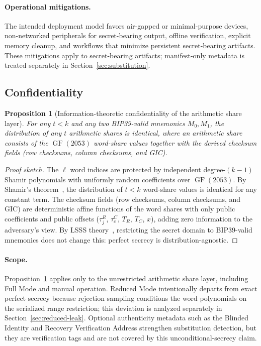 \documentclass[11pt]{article}
\newcommand{\GF}{\operatorname{GF}}
\newtheorem{proposition}[theorem]{Proposition}
\begin{document}
\paragraph{Operational mitigations.} The intended deployment model favors air-gapped or minimal-purpose devices, non-networked peripherals for secret-bearing output, offline verification, explicit memory cleanup, and workflows that minimize persistent secret-bearing artifacts. These mitigations apply to secret-bearing artifacts; manifest-only metadata is treated separately in Section~\ref{sec:substitution}.

\subsection{Confidentiality}

\begin{proposition}[Information-theoretic confidentiality of the arithmetic share layer]
\label{prop:conf}
For any $t < k$ and any two BIP39-valid mnemonics $M_0, M_1$, the distribution of any $t$ arithmetic shares is identical, where an arithmetic share consists of the $\GF(2053)$ word-share values together with the derived checksum fields (row checksums, column checksums, and GIC).
\end{proposition}

\begin{proof}[Proof sketch]
The $\ell$ word indices are protected by independent degree-$(k{-}1)$ Shamir polynomials with uniformly random coefficients over $\GF(2053)$. By Shamir's theorem~\cite{shamir1979}, the distribution of $t < k$ word-share values is identical for any constant term. The checksum fields (row checksums, column checksums, and GIC) are deterministic affine functions of the word shares with only public coefficients and public offsets ($\tau^R_j$, $\tau^C_c$, $T_R$, $T_C$, $x$), adding zero information to the adversary's view. By LSSS theory~\cite{beimel2011,cramer2000}, restricting the secret domain to BIP39-valid mnemonics does not change this: perfect secrecy is distribution-agnostic.
\end{proof}

\paragraph{Scope.} Proposition~\ref{prop:conf} applies only to the unrestricted arithmetic share layer, including Full Mode and manual operation. Reduced Mode intentionally departs from exact perfect secrecy because rejection sampling conditions the word polynomials on the serialized range restriction; this deviation is analyzed separately in Section~\ref{sec:reduced-leak}. Optional authenticity metadata such as the Blinded Identity and Recovery Verification Address strengthen substitution detection, but they are verification tags and are not covered by this unconditional-secrecy claim.
\end{document}

